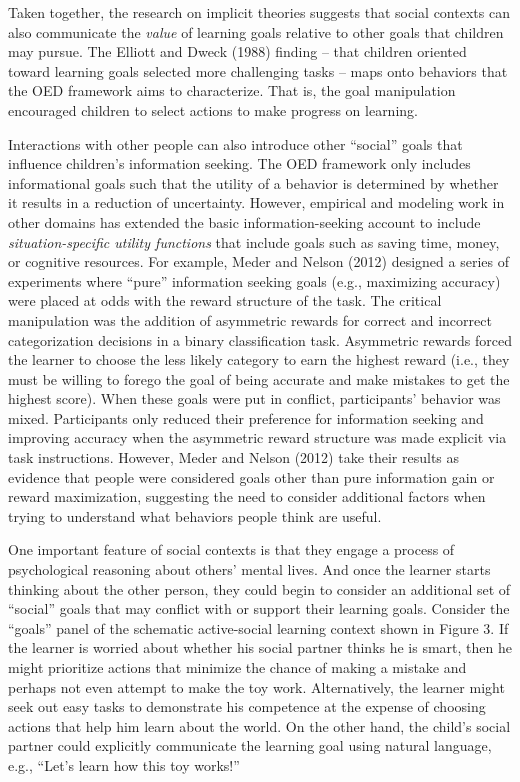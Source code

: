 \documentclass[english,floatsintext,man]{apa6}
\theoremstyle{definition}
\theoremstyle{definition}
\theoremstyle{definition}
\theoremstyle{remark}
\begin{document}
Taken together, the research on implicit theories suggests that social
contexts can also communicate the \emph{value} of learning goals
relative to other goals that children may pursue. The Elliott and Dweck
(1988) finding -- that children oriented toward learning goals selected
more challenging tasks -- maps onto behaviors that the OED framework
aims to characterize. That is, the goal manipulation encouraged children
to select actions to make progress on learning.

Interactions with other people can also introduce other \enquote{social}
goals that influence children's information seeking. The OED framework
only includes informational goals such that the utility of a behavior is
determined by whether it results in a reduction of uncertainty. However,
empirical and modeling work in other domains has extended the basic
information-seeking account to include \emph{situation-specific utility
functions} that include goals such as saving time, money, or cognitive
resources. For example, Meder and Nelson (2012) designed a series of
experiments where \enquote{pure} information seeking goals (e.g.,
maximizing accuracy) were placed at odds with the reward structure of
the task. The critical manipulation was the addition of asymmetric
rewards for correct and incorrect categorization decisions in a binary
classification task. Asymmetric rewards forced the learner to choose the
less likely category to earn the highest reward (i.e., they must be
willing to forego the goal of being accurate and make mistakes to get
the highest score). When these goals were put in conflict, participants'
behavior was mixed. Participants only reduced their preference for
information seeking and improving accuracy when the asymmetric reward
structure was made explicit via task instructions. However, Meder and
Nelson (2012) take their results as evidence that people were considered
goals other than pure information gain or reward maximization,
suggesting the need to consider additional factors when trying to
understand what behaviors people think are useful.

One important feature of social contexts is that they engage a process
of psychological reasoning about others' mental lives. And once the
learner starts thinking about the other person, they could begin to
consider an additional set of \enquote{social} goals that may conflict
with or support their learning goals. Consider the \enquote{goals} panel
of the schematic active-social learning context shown in Figure 3. If
the learner is worried about whether his social partner thinks he is
smart, then he might prioritize actions that minimize the chance of
making a mistake and perhaps not even attempt to make the toy work.
Alternatively, the learner might seek out easy tasks to demonstrate his
competence at the expense of choosing actions that help him learn about
the world. On the other hand, the child's social partner could
explicitly communicate the learning goal using natural language, e.g.,
\enquote{Let's learn how this toy works!}
\end{document}
